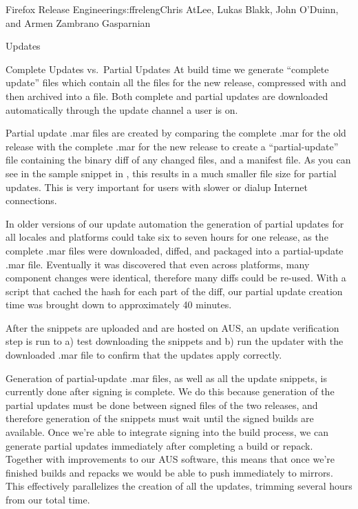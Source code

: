 \begin{aosachapter}{Firefox Release Engineering}{s:ffreleng}{Chris AtLee, Lukas Blakk, John O'Duinn, and Armen Zambrano Gasparnian}
\begin{aosasect1}{Updates}
\begin{aosasect2}{Complete Updates vs.\ Partial Updates}
At build time we generate ``complete update''  files which
contain all the files for the new release, compressed with 
and then archived into a  file. Both complete and partial
updates are downloaded automatically through the update channel a user
is on.

Partial update .mar files are created by comparing the complete .mar for the
old release with the complete .mar for the new release to create a
``partial-update''  file containing the binary diff of any
changed files, and a manifest file. As you can see in the sample
snippet in , this results in a much smaller file size for partial
updates. This is very important for users with slower or
dialup Internet connections.

In older versions of our update automation the generation of partial
updates for all locales and platforms could take six to seven hours for one
release, as the complete .mar files were downloaded, diffed, and packaged into a
partial-update .mar file. Eventually it was discovered that even
across platforms, many component changes were identical, therefore many diffs could be re-used. With a
script that cached the hash for each part of the diff, our partial
update creation time was brought down to approximately 40 minutes. 

After the snippets are
uploaded and are hosted on AUS, an update verification step is run to
a) test downloading the snippets and b) run the updater with the
downloaded .mar file to confirm that the updates apply correctly.

Generation of partial-update .mar files, as well as all the update snippets,
is currently done after signing is complete. We do this because
generation of the partial updates must be done between signed files of
the two releases, and therefore generation of the snippets must wait
until the signed builds are available.  Once we're able to integrate
signing into the build process, we can generate partial updates
immediately after completing a build or repack. Together with
improvements to our AUS software, this means that once we're finished
builds and repacks we would be able to push immediately to
mirrors. This effectively parallelizes the creation of all the
updates, trimming several hours from our total time.
  
\end{aosasect2}

\end{aosasect1}


\end{aosachapter}
